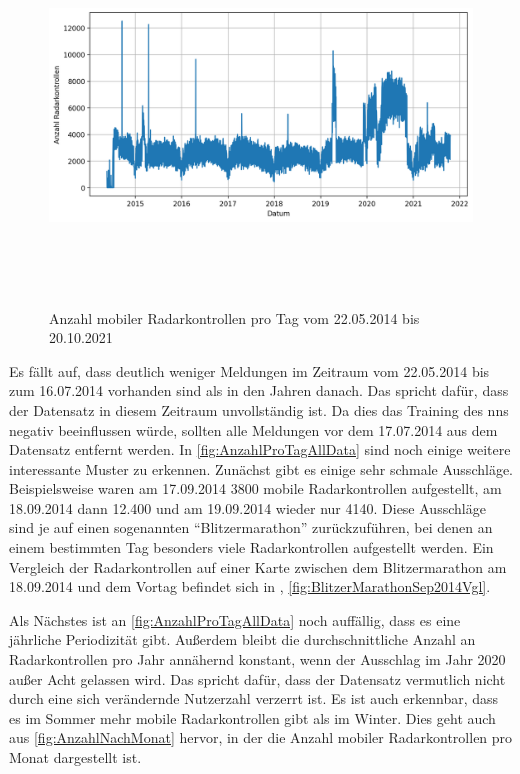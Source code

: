 \begin{figure}[h]
    \centering
    \includegraphics[width=1.0\textwidth,height=10cm,keepaspectratio=true]{content/images/AnzahlProTagAllData.png}
    \caption{Anzahl mobiler Radarkontrollen pro Tag vom 22.05.2014 bis 20.10.2021}
    \label{fig:AnzahlProTagAllData}
\end{figure}

Es fällt auf, dass deutlich weniger Meldungen im Zeitraum vom 22.05.2014 bis zum 16.07.2014 vorhanden sind als in den Jahren danach.
Das spricht dafür, dass der Datensatz in diesem Zeitraum unvollständig ist.
Da dies das Training des \acrshort{nn}s negativ beeinflussen würde, sollten alle Meldungen vor dem 17.07.2014 aus dem Datensatz entfernt werden.
In \autoref{fig:AnzahlProTagAllData} sind noch einige weitere interessante Muster zu erkennen.
Zunächst gibt es einige sehr schmale Ausschläge.
Beispielsweise waren am 17.09.2014 3800 mobile Radarkontrollen aufgestellt, am 18.09.2014 dann 12.400 und am 19.09.2014 wieder nur 4140.
Diese Ausschläge sind je auf einen sogenannten "`Blitzermarathon"' zurückzuführen, bei denen an einem bestimmten Tag besonders viele Radarkontrollen aufgestellt werden.
Ein Vergleich der Radarkontrollen auf einer Karte zwischen dem Blitzermarathon am 18.09.2014 und dem Vortag befindet sich in , \autoref{fig:BlitzerMarathonSep2014Vgl}.

Als Nächstes ist an \autoref{fig:AnzahlProTagAllData} noch auffällig, dass es eine jährliche Periodizität gibt.
Außerdem bleibt die durchschnittliche Anzahl an Radarkontrollen pro Jahr annähernd konstant, wenn der Ausschlag im Jahr 2020 außer Acht gelassen wird.
Das spricht dafür, dass der Datensatz vermutlich nicht durch eine sich verändernde Nutzerzahl verzerrt ist.
Es ist auch erkennbar, dass es im Sommer mehr mobile Radarkontrollen gibt als im Winter.
Dies geht auch aus \autoref{fig:AnzahlNachMonat} hervor, in der die Anzahl mobiler Radarkontrollen pro Monat dargestellt ist.

